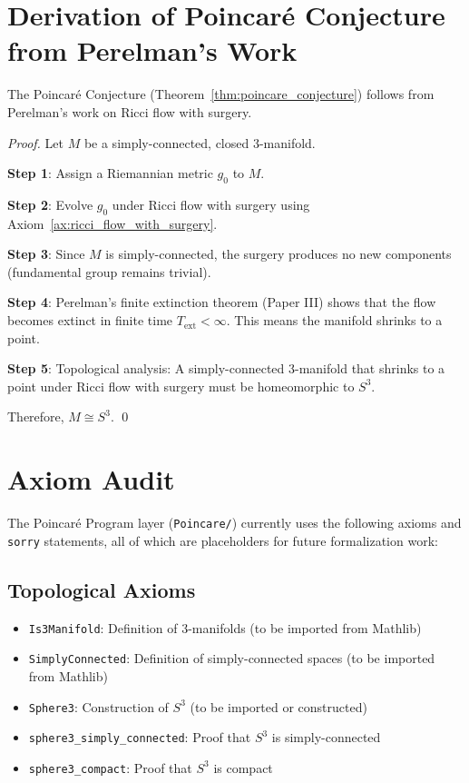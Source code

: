 \chapter{Derivation of Poincaré Conjecture from Perelman's Work}
\label{chap:poincare_derivation}

\begin{theorem}
\label{thm:poincare_from_perelman}
The Poincaré Conjecture (Theorem~\ref{thm:poincare_conjecture}) follows from Perelman's work on Ricci flow with surgery.
\end{theorem}

\begin{proof}
Let $M$ be a simply-connected, closed 3-manifold.

\textbf{Step 1}: Assign a Riemannian metric $g_0$ to $M$.

\textbf{Step 2}: Evolve $g_0$ under Ricci flow with surgery using Axiom~\ref{ax:ricci_flow_with_surgery}.

\textbf{Step 3}: Since $M$ is simply-connected, the surgery produces no new components (fundamental group remains trivial).

\textbf{Step 4}: Perelman's finite extinction theorem (Paper III) shows that the flow becomes extinct in finite time $T_{\text{ext}} < \infty$. This means the manifold shrinks to a point.

\textbf{Step 5}: Topological analysis: A simply-connected 3-manifold that shrinks to a point under Ricci flow with surgery must be homeomorphic to $S^3$.

Therefore, $M \cong S^3$. \qed
\end{proof}

\chapter{Axiom Audit}
\label{chap:axiom_audit}

The Poincaré Program layer (\texttt{Poincare/}) currently uses the following axioms and \texttt{sorry} statements, all of which are placeholders for future formalization work:

\section{Topological Axioms}
\begin{itemize}
\item \texttt{Is3Manifold}: Definition of 3-manifolds (to be imported from Mathlib)
\item \texttt{SimplyConnected}: Definition of simply-connected spaces (to be imported from Mathlib)
\item \texttt{Sphere3}: Construction of $S^3$ (to be imported or constructed)
\item \texttt{sphere3\_simply\_connected}: Proof that $S^3$ is simply-connected
\item \texttt{sphere3\_compact}: Proof that $S^3$ is compact
\end{itemize}

